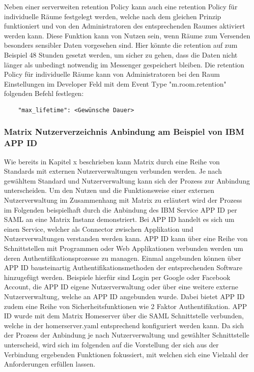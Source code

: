 Neben einer serverweiten retention Policy kann auch eine retention Policy für individuelle Räume festgelegt werden, welche nach dem gleichen Prinzip funktioniert und von den Administratoren des entsprechenden Raumes aktiviert werden kann. Diese Funktion kann von Nutzen sein, wenn Räume zum Versenden besonders sensibler Daten vorgesehen sind. Hier könnte die retention auf zum Beispiel 48 Stunden gesetzt werden, um sicher zu gehen, dass die Daten nicht länger als unbedingt notwendig im Messenger gespeichert bleiben. Die retention Policy für individuelle Räume kann von Administratoren bei den Raum Einstellungen im Developer Feld mit dem Event Type "m.room.retention" folgenden Befehl festlegen:

\begin{lstlisting}
    "max_lifetime": <Gewünsche Dauer>
\end{lstlisting}

\subsubsection{Matrix Nutzerverzeichnis Anbindung am Beispiel von IBM APP ID}\label{chapter:vdmf}
Wie bereits in Kapitel x beschrieben kann Matrix durch eine Reihe von Standards mit externen Nutzerverwaltungen verbunden werden.
Je nach gewähltem Standard und Nutzerverwaltung kann sich der Prozess zur Anbindung unterscheiden. Um den Nutzen und die Funktionsweise einer externen Nutzerverwaltung im Zusammenhang mit Matrix zu erläutert wird der Prozess im Folgenden beispielhaft durch die Anbindung des IBM Service APP ID per SAML an eine Matrix Instanz demonstriert. Bei APP ID handelt es sich um einen Service, welcher als Connector zwischen Applikation und Nutzerverwaltungen verstanden werden kann. APP ID kann über eine Reihe von Schnittstellen mit Programmen oder Web Applikationen verbunden werden um deren Authentifikationsprozesse zu managen. Einmal angebunden können über APP ID bausteinartig Authentifikationsmethoden der entsprechenden Software hinzugefügt werden. Beispiele hierfür sind Login per Google oder Facebook Account, die APP ID eigene Nutzerverwaltung oder über eine weitere externe Nutzerverwaltung, welche an APP ID angebunden wurde. Dabei bietet APP ID zudem eine Reihe von Sicherheitsfunktionen wie 2 Faktor Authentifikation.
APP ID wurde mit dem Matrix Homeserver über die SAML Schnittstelle verbunden, welche in der homerserver.yaml entsprechend konfiguriert werden kann. Da sich der Prozess der Anbindung je nach Nutzerverwaltung und gewählter Schnittstelle unterscheid, wird sich im folgenden auf die Vorstellung der sich aus der Verbindung ergebenden Funktionen fokussiert, mit welchen sich eine Vielzahl der Anforderungen erfüllen lassen.


